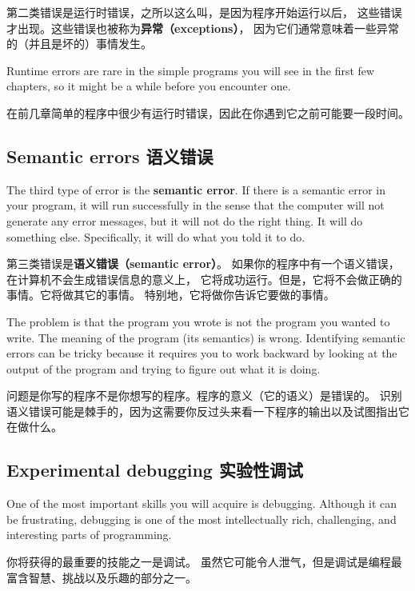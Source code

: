 \documentclass[10pt]{book}
\begin{document}
\begin{CJK}{UTF8}{gbsn}
第二类错误是运行时错误，之所以这么叫，是因为程序开始运行以后，
这些错误才出现。这些错误也被称为{\bf 异常（exceptions）}，
因为它们通常意味着一些异常的（并且是坏的）事情发生。

Runtime errors are rare in the simple programs you will see in the
first few chapters, so it might be a while before you encounter one.

在前几章简单的程序中很少有运行时错误，因此在你遇到它之前可能要一段时间。

\subsection{Semantic errors 语义错误}

The third type of error is the {\bf semantic error}.  If there is a
semantic error in your program, it will run successfully in the sense
that the computer will not generate any error messages, but it will
not do the right thing.  It will do something else.  Specifically, it
will do what you told it to do.

第三类错误是{\bf 语义错误（semantic error）}。
如果你的程序中有一个语义错误，在计算机不会生成错误信息的意义上，
它将成功运行。但是，它将不会做正确的事情。它将做其它的事情。
特别地，它将做你告诉它要做的事情。

The problem is that the program you wrote is not the program you
wanted to write.  The meaning of the program (its semantics) is wrong.
Identifying semantic errors can be tricky because it requires you to work
backward by looking at the output of the program and trying to figure
out what it is doing.

问题是你写的程序不是你想写的程序。程序的意义（它的语义）是错误的。
识别语义错误可能是棘手的，因为这需要你反过头来看一下程序的输出以及试图指出它在做什么。

\subsection{Experimental debugging 实验性调试}

One of the most important skills you will acquire is debugging.
Although it can be frustrating, debugging is one of the most
intellectually rich, challenging, and interesting parts of
programming.

你将获得的最重要的技能之一是调试。
虽然它可能令人泄气，但是调试是编程最富含智慧、挑战以及乐趣的部分之一。


\end{CJK}
\end{document}

